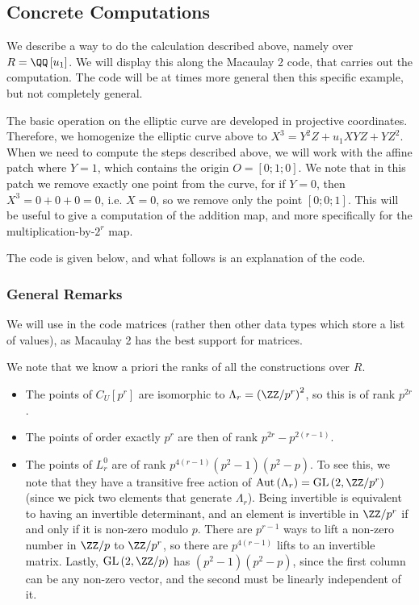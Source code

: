 \subsection{Concrete Computations}

We describe a way to do the calculation described above, namely over $R = \QQ\left[u_1\right]$.
We will display this along the Macaulay 2 code, that carries out the computation.
The code will be at times more general then this specific example, but not completely general.

The basic operation on the elliptic curve are developed in projective coordinates.
Therefore, we homogenize the elliptic curve above to $X^3 = Y^2 Z + u_1 X Y Z + Y Z^2$.
When we need to compute the steps described above, we will work with the affine patch where $Y = 1$, which contains the origin $O = \left[0;1;0\right]$.
We note that in this patch we remove exactly one point from the curve, for if $Y = 0$, then $X^3 = 0 + 0 + 0 = 0$, i.e. $X = 0$, so we remove only the point $\left[0;0;1\right]$.
This will be useful to give a computation of the addition map, and more specifically for the multiplication-by-$2^r$ map.

The code is given below, and what follows is an explanation of the code.

\subsubsection{General Remarks}\label{rank-considerations}

We will use in the code matrices (rather then other data types which store a list of values), as Macaulay 2 has the best support for matrices.

We note that we know a priori the ranks of all the constructions over $R$.
\begin{itemize}
	\item The points of $C_U\left[p^r\right]$ are isomorphic to $\Lambda_r = \left(\ZZ/p^r\right)^2$, so this is of rank $p^{2r}$.
	\item The points of order exactly $p^r$ are then of rank $p^{2r}-p^{2\left(r-1\right)}$.
	\item
		The points of $L_r^0$ are of rank $p^{4\left(r-1\right)}\left(p^2-1\right)\left(p^2-p\right)$.
		To see this, we note that they have a transitive free action of $\aut\left(\Lambda_r\right) = \GL\left(2, \ZZ/p^r\right)$ (since we pick two elements that generate $\Lambda_r$).
		Being invertible is equivalent to having an invertible determinant, and an element is invertible in $\ZZ/p^r$ if and only if it is non-zero modulo $p$.
		There are $p^{r-1}$ ways to lift a non-zero number in $\ZZ/p$ to $\ZZ/p^r$, so there are $p^{4\left(r-1\right)}$ lifts to an invertible matrix.
		Lastly, $\GL\left(2, \ZZ/p\right)$ has $\left(p^2-1\right)\left(p^2-p\right)$, since the first column can be any non-zero vector, and the second must be linearly independent of it.
\end{itemize}

